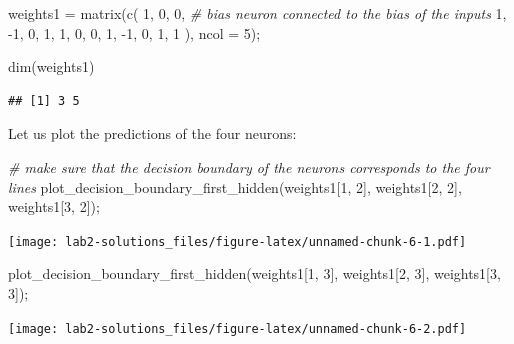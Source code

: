 \documentclass[
]{article}
\newenvironment{Shaded}{\begin{snugshade}}{\end{snugshade}}
\newcommand{\AttributeTok}[1]{\textcolor[rgb]{0.77,0.63,0.00}{#1}}
\newcommand{\CommentTok}[1]{\textcolor[rgb]{0.56,0.35,0.01}{\textit{#1}}}
\newcommand{\DecValTok}[1]{\textcolor[rgb]{0.00,0.00,0.81}{#1}}
\newcommand{\FunctionTok}[1]{\textcolor[rgb]{0.00,0.00,0.00}{#1}}
\newcommand{\NormalTok}[1]{#1}
\newcommand{\OtherTok}[1]{\textcolor[rgb]{0.56,0.35,0.01}{#1}}
\newcommand{\SpecialCharTok}[1]{\textcolor[rgb]{0.00,0.00,0.00}{#1}}
\begin{document}
\begin{Shaded}
\begin{Highlighting}[]
\NormalTok{weights1 }\OtherTok{=} \FunctionTok{matrix}\NormalTok{(}\FunctionTok{c}\NormalTok{(}
  \DecValTok{1}\NormalTok{, }\DecValTok{0}\NormalTok{, }\DecValTok{0}\NormalTok{,   }\CommentTok{\# bias neuron connected to the bias of the inputs}
  \DecValTok{1}\NormalTok{, }\SpecialCharTok{{-}}\DecValTok{1}\NormalTok{, }\DecValTok{0}\NormalTok{,}
  \DecValTok{1}\NormalTok{, }\DecValTok{1}\NormalTok{, }\DecValTok{0}\NormalTok{,}
  \DecValTok{0}\NormalTok{, }\DecValTok{1}\NormalTok{, }\SpecialCharTok{{-}}\DecValTok{1}\NormalTok{,}
  \DecValTok{0}\NormalTok{, }\DecValTok{1}\NormalTok{, }\DecValTok{1}
\NormalTok{), }\AttributeTok{ncol =} \DecValTok{5}\NormalTok{);}

\FunctionTok{dim}\NormalTok{(weights1)}
\end{Highlighting}
\end{Shaded}

\begin{verbatim}
## [1] 3 5
\end{verbatim}

Let us plot the predictions of the four neurons:

\begin{Shaded}
\begin{Highlighting}[]
\CommentTok{\# make sure that the decision boundary of the neurons corresponds to the four lines}
\FunctionTok{plot\_decision\_boundary\_first\_hidden}\NormalTok{(weights1[}\DecValTok{1}\NormalTok{, }\DecValTok{2}\NormalTok{], weights1[}\DecValTok{2}\NormalTok{, }\DecValTok{2}\NormalTok{], weights1[}\DecValTok{3}\NormalTok{, }\DecValTok{2}\NormalTok{]);}
\end{Highlighting}
\end{Shaded}

\texttt{[image: lab2-solutions\_files/figure-latex/unnamed-chunk-6-1.pdf]}

\begin{Shaded}
\begin{Highlighting}[]
\FunctionTok{plot\_decision\_boundary\_first\_hidden}\NormalTok{(weights1[}\DecValTok{1}\NormalTok{, }\DecValTok{3}\NormalTok{], weights1[}\DecValTok{2}\NormalTok{, }\DecValTok{3}\NormalTok{], weights1[}\DecValTok{3}\NormalTok{, }\DecValTok{3}\NormalTok{]);}
\end{Highlighting}
\end{Shaded}

\texttt{[image: lab2-solutions\_files/figure-latex/unnamed-chunk-6-2.pdf]}
\end{document}
